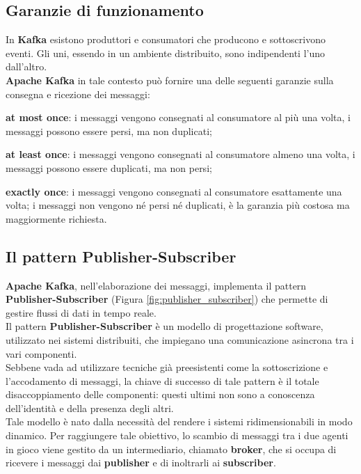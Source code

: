 \subsection{Garanzie di funzionamento}
In \textbf{Kafka} esistono produttori e consumatori che producono e sottoscrivono eventi. Gli uni, essendo in un ambiente distribuito,
sono indipendenti l’uno dall’altro. \\
\textbf{Apache Kafka} in tale contesto può fornire una delle seguenti garanzie sulla consegna e ricezione dei messaggi:
\begin{list}{*}
    \item \textbf{at most once}: i messaggi vengono consegnati al consumatore al più una volta, i messaggi possono essere persi, ma non duplicati;
   \item \item  \textbf{at least once}: i messaggi vengono consegnati al consumatore almeno una volta, i messaggi possono essere duplicati, ma non persi;
    \item \textbf{exactly once}: i messaggi vengono consegnati al consumatore esattamente una volta; i messaggi non vengono né persi né duplicati, è la garanzia più costosa ma maggiormente richiesta.
\end{list}
\subsection{Il pattern Publisher-Subscriber}
\textbf{Apache Kafka}, nell'elaborazione dei messaggi, implementa il pattern \textbf{Publisher-Subscriber} (Figura \ref{fig:publisher_subscriber}) che permette di gestire flussi di dati in tempo reale.\\
Il pattern \textbf{Publisher-Subscriber} è un modello di progettazione software, utilizzato nei sistemi distribuiti, che impiegano una comunicazione asincrona tra i vari componenti.\\
Sebbene vada ad utilizzare tecniche già preesistenti come la sottoscrizione e l'accodamento di messaggi, la  chiave di successo di tale pattern è il totale disaccoppiamento delle componenti: questi ultimi non sono a conoscenza dell'identità e della presenza degli altri.\\
Tale modello è nato dalla necessità del rendere i sistemi ridimensionabili in modo dinamico. Per raggiungere tale obiettivo, lo scambio di messaggi 
tra i due agenti in gioco viene gestito da un intermediario, chiamato \textbf{broker}, che si occupa di ricevere i messaggi dai \textbf{publisher} e di inoltrarli ai \textbf{subscriber}.\\

